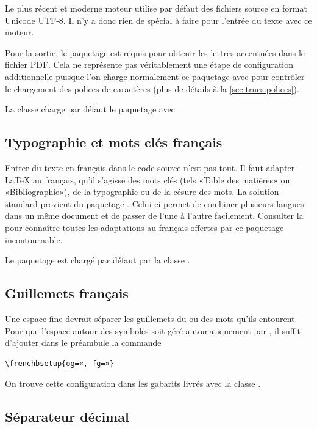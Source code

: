 Le plus récent et moderne moteur {\XeTeX} utilise par défaut des
fichiers source en format Unicode UTF-8. Il n'y a donc rien de spécial
à faire pour l'entrée du texte avec ce moteur.

Pour la sortie, le paquetage  \citep{fontspec} est
requis pour obtenir les lettres accentuées dans le fichier PDF. Cela ne
représente pas véritablement une étape de configuration additionnelle
puisque l'on charge normalement ce paquetage avec {\XeLaTeX} pour
contrôler le chargement des polices de caractères (plus de détails à
la \autoref{sec:trucs:polices}).

La classe  charge par défaut le paquetage
 avec {\XeLaTeX}.

\subsection{Typographie et mots clés français}
\label{sec:bases:francais:babel}

Entrer du texte en français dans le code source n'est pas tout. Il
faut adapter {\LaTeX} au français, qu'il s'agisse des mots clés (tels
«Table des matières» ou «Bibliographie»), de la typographie ou de la
césure des mots. La solution standard provient du paquetage
 \citep{babel}. Celui-ci permet de combiner plusieurs
langues dans un même document et de passer de l'une à l'autre
facilement. Consulter la %
pour connaître toutes les adaptations au français offertes par ce
paquetage incontournable.

Le paquetage  est chargé par défaut par la classe
.

\subsection{Guillemets français}
\label{sec:bases:francais:guillemets}

Une espace fine devrait séparer les guillemets du ou des mots qu'ils
entourent. Pour que l'espace autour des symboles soit géré
automatiquement par , il suffit d'ajouter dans le préambule
la commande
\begin{lstlisting}
\frenchbsetup{og=«, fg=»}
\end{lstlisting}
On trouve cette configuration dans les gabarits livrés avec la classe
.

\subsection{Séparateur décimal}
\label{sec:bases:francais:virgule}

